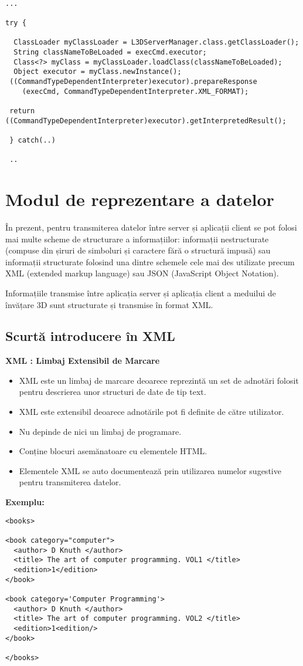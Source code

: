 \begin{verbatim}

...

try {

  ClassLoader myClassLoader = L3DServerManager.class.getClassLoader();
  String classNameToBeLoaded = execCmd.executor;
  Class<?> myClass = myClassLoader.loadClass(classNameToBeLoaded);
  Object executor = myClass.newInstance();
 ((CommandTypeDependentInterpreter)executor).prepareResponse 
 	(execCmd, CommandTypeDependentInterpreter.XML_FORMAT);
 
 return ((CommandTypeDependentInterpreter)executor).getInterpretedResult();
 
 } catch(..)
 
 ..
\end{verbatim}

\section{Modul de reprezentare a datelor}
\par În prezent, pentru transmiterea datelor între server și aplicații client se pot folosi mai multe scheme de structurare a informațiilor: informații nestructurate (compuse din șiruri de simboluri și caractere fără o structură impusă) sau informații structurate folosind una dintre schemele cele mai des utilizate precum XML (extended markup language) sau JSON (JavaScript Object Notation).
\par Informațiile transmise între aplicația server și aplicația client a meduilui de învățare 3D sunt structurate și transmise în format XML.
\subsection{Scurtă introducere în XML}

\textbf{XML : Limbaj Extensibil de Marcare}
\begin{itemize}
\item XML este un limbaj de marcare deoarece reprezintă un set de adnotări folosit pentru descrierea unor structuri de date de tip text.
\item XML este extensibil deoarece adnotările pot fi definite de către utilizator.
\item Nu depinde de nici un limbaj de programare.
\item Conține blocuri asemănatoare cu elementele HTML.
\item Elementele XML se auto documentează prin utilizarea numelor sugestive pentru transmiterea datelor.
\end{itemize}
\par \textbf{ Exemplu: }
\begin{verbatim}
<books>

<book category="computer">
  <author> D Knuth </author>
  <title> The art of computer programming. VOL1 </title>
  <edition>1</edition>
</book>

<book category='Computer Programming'>
  <author> D Knuth </author>
  <title> The art of computer programming. VOL2 </title>
  <edition>1<edition/>
</book>

</books>
\end{verbatim}


